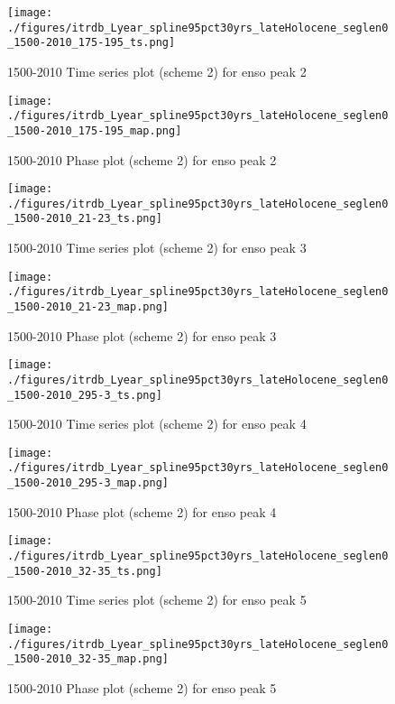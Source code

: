 \documentclass[smallextended]{svjour3}       %
\begin{document}
\begin{figure}[!tbp]
\centering
\begin{minipage}[b]{0.45\textwidth}
\texttt{[image: ./figures/itrdb\_Lyear\_spline95pct30yrs\_lateHolocene\_seglen0\_1500-2010\_175-195\_ts.png]}
\caption{1500-2010 Time series plot (scheme 2) for enso peak 2}
\label{ts_2}
\end{minipage}
\hfill
\begin{minipage}[b]{0.45\textwidth}
\texttt{[image: ./figures/itrdb\_Lyear\_spline95pct30yrs\_lateHolocene\_seglen0\_1500-2010\_175-195\_map.png]}
\caption{1500-2010 Phase plot (scheme 2) for enso peak 2}
\label{map_2}
\end{minipage}
\end{figure}

\begin{figure}[!tbp]
\centering
\begin{minipage}[b]{0.45\textwidth}
\texttt{[image: ./figures/itrdb\_Lyear\_spline95pct30yrs\_lateHolocene\_seglen0\_1500-2010\_21-23\_ts.png]}
\caption{1500-2010 Time series plot (scheme 2) for enso peak 3}
\label{ts_3}
\end{minipage}
\hfill
\begin{minipage}[b]{0.45\textwidth}
\texttt{[image: ./figures/itrdb\_Lyear\_spline95pct30yrs\_lateHolocene\_seglen0\_1500-2010\_21-23\_map.png]}
\caption{1500-2010 Phase plot (scheme 2) for enso peak 3}
\label{map_3}
\end{minipage}
\end{figure}

\begin{figure}[!tbp]
\centering
\begin{minipage}[b]{0.45\textwidth}
\texttt{[image: ./figures/itrdb\_Lyear\_spline95pct30yrs\_lateHolocene\_seglen0\_1500-2010\_295-3\_ts.png]}
\caption{1500-2010 Time series plot (scheme 2) for enso peak 4}
\label{ts_4}
\end{minipage}
\hfill
\begin{minipage}[b]{0.45\textwidth}
\texttt{[image: ./figures/itrdb\_Lyear\_spline95pct30yrs\_lateHolocene\_seglen0\_1500-2010\_295-3\_map.png]}
\caption{1500-2010 Phase plot (scheme 2) for enso peak 4}
\label{map_4}
\end{minipage}
\end{figure}

\begin{figure}[!tbp]
\centering
\begin{minipage}[b]{0.45\textwidth}
\texttt{[image: ./figures/itrdb\_Lyear\_spline95pct30yrs\_lateHolocene\_seglen0\_1500-2010\_32-35\_ts.png]}
\caption{1500-2010 Time series plot (scheme 2) for enso peak 5}
\label{ts_5}
\end{minipage}
\hfill
\begin{minipage}[b]{0.45\textwidth}
\texttt{[image: ./figures/itrdb\_Lyear\_spline95pct30yrs\_lateHolocene\_seglen0\_1500-2010\_32-35\_map.png]}
\caption{1500-2010 Phase plot (scheme 2) for enso peak 5}
\label{map_5}
\end{minipage}
\end{figure}
\end{document}
